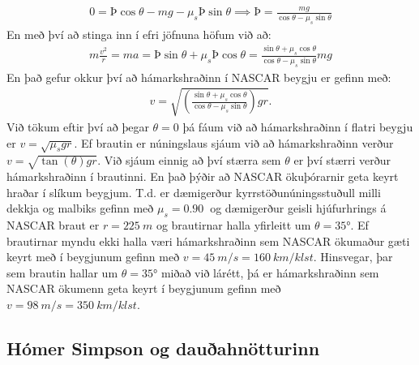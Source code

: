 \begin{minipage}{\linewidth}
\begin{align*}
    0 = \text{Þ} \cos\theta - mg - \mu_s \text{Þ} \sin\theta \implies \text{Þ} = \frac{mg}{\cos\theta - \mu_s \sin\theta}
\end{align*}
En með því að stinga inn í efri jöfnuna höfum við að:
\begin{align*}
    m \frac{v^2}{r} = ma = \text{Þ} \sin\theta + \mu_s Þ \cos\theta = \frac{\sin\theta + \mu_s \cos\theta}{\cos\theta - \mu_s \sin\theta} mg
\end{align*}
En það gefur okkur því að hámarkshraðinn í NASCAR beygju er gefinn með:
\begin{align*}
    v = \sqrt{\left(\frac{\sin\theta + \mu_s \cos\theta}{\cos\theta - \mu_s \sin\theta}\right)gr}.
\end{align*}
Við tökum eftir því að þegar $\theta = 0$ þá fáum við að hámarkshraðinn í flatri beygju er $v = \sqrt{\mu_s gr}$. Ef brautin er núningslaus sjáum við að hámarkshraðinn verður $v = \sqrt{\tan(\theta) gr}$. Við sjáum einnig að því stærra sem $\theta$ er því stærri verður hámarkshraðinn í brautinni. En það þýðir að NASCAR ökuþórarnir geta keyrt hraðar í slíkum beygjum. T.d. er dæmigerður kyrrstöðunúningsstuðull milli dekkja og malbiks gefinn með $\mu_s = \SI{0.90}{}$ og dæmigerður geisli hjúfurhrings á NASCAR braut er $r = \SI{225}{m}$ og brautirnar halla yfirleitt um $\theta = \ang{35}$. Ef brautirnar myndu ekki halla væri hámarkshraðinn sem NASCAR ökumaður gæti keyrt með í beygjunum gefinn með $v = \SI{45}{m/s} = \SI{160}{km/klst}$. Hinsvegar, þar sem brautin hallar um $\theta = \ang{35}$ miðað við lárétt, þá er hámarkshraðinn sem NASCAR ökumenn geta keyrt í beygjunum gefinn með $v = \SI{98}{m/s} = \SI{350}{km/klst}$.  

\end{minipage}

\subsection*{Hómer Simpson og dauðahnötturinn}

